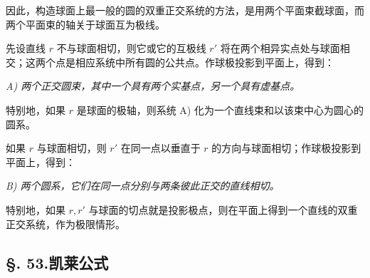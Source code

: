 因此，构造球面上最一般的圆的双重正交系统的方法，是用两个平面束截球面，而两个平面束的轴关于球面互为极线。

先设直线 \(r\) 不与球面相切，则它或它的互极线 \(r'\) 将在两个相异实点处与球面相交；这两个点是相应系统中所有圆的公共点。作球极投影到平面上，得到：

\emph{A) 两个正交圆束，其中一个具有两个实基点，另一个具有虚基点。}

特别地，如果 \(r\) 是球面的极轴，则系统 A) 化为一个直线束和以该束中心为圆心的圆系。

如果 \(r\) 与球面相切，则 \(r'\) 在同一点以垂直于 \(r\) 的方向与球面相切；作球极投影到平面上，得到：

\emph{B) 两个圆系，它们在同一点分别与两条彼此正交的直线相切。}

特别地，如果 \(r,r'\) 与球面的切点就是投影极点，则在平面上得到一个直线的双重正交系统，作为极限情形。

\subsection*{\S. 53.\quad 凯莱公式}

